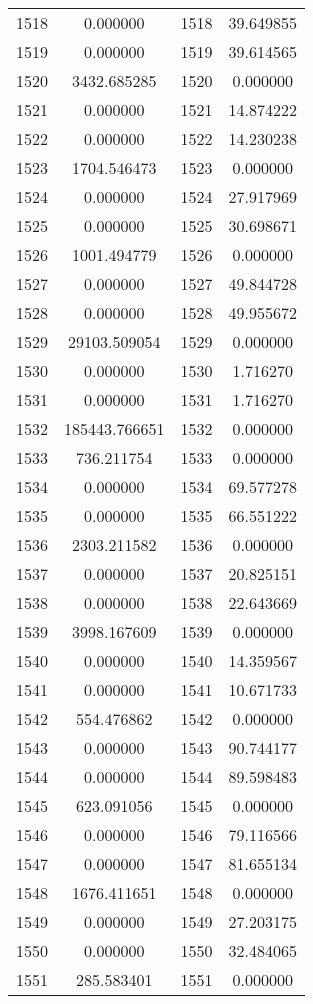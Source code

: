 \documentclass[12pt]{article}
\begin{document}
\begin{longtable}{@{}cccc@{}}
1518 & 0.000000 & 1518 & 39.649855 \\
1519 & 0.000000 & 1519 & 39.614565 \\
1520 & 3432.685285 & 1520 & 0.000000 \\
1521 & 0.000000 & 1521 & 14.874222 \\
1522 & 0.000000 & 1522 & 14.230238 \\
1523 & 1704.546473 & 1523 & 0.000000 \\
1524 & 0.000000 & 1524 & 27.917969 \\
1525 & 0.000000 & 1525 & 30.698671 \\
1526 & 1001.494779 & 1526 & 0.000000 \\
1527 & 0.000000 & 1527 & 49.844728 \\
1528 & 0.000000 & 1528 & 49.955672 \\
1529 & 29103.509054 & 1529 & 0.000000 \\
1530 & 0.000000 & 1530 & 1.716270 \\
1531 & 0.000000 & 1531 & 1.716270 \\
1532 & 185443.766651 & 1532 & 0.000000 \\
1533 & 736.211754 & 1533 & 0.000000 \\
1534 & 0.000000 & 1534 & 69.577278 \\
1535 & 0.000000 & 1535 & 66.551222 \\
1536 & 2303.211582 & 1536 & 0.000000 \\
1537 & 0.000000 & 1537 & 20.825151 \\
1538 & 0.000000 & 1538 & 22.643669 \\
1539 & 3998.167609 & 1539 & 0.000000 \\
1540 & 0.000000 & 1540 & 14.359567 \\
1541 & 0.000000 & 1541 & 10.671733 \\
1542 & 554.476862 & 1542 & 0.000000 \\
1543 & 0.000000 & 1543 & 90.744177 \\
1544 & 0.000000 & 1544 & 89.598483 \\
1545 & 623.091056 & 1545 & 0.000000 \\
1546 & 0.000000 & 1546 & 79.116566 \\
1547 & 0.000000 & 1547 & 81.655134 \\
1548 & 1676.411651 & 1548 & 0.000000 \\
1549 & 0.000000 & 1549 & 27.203175 \\
1550 & 0.000000 & 1550 & 32.484065 \\
1551 & 285.583401 & 1551 & 0.000000 \\

\end{longtable}
\end{document}
